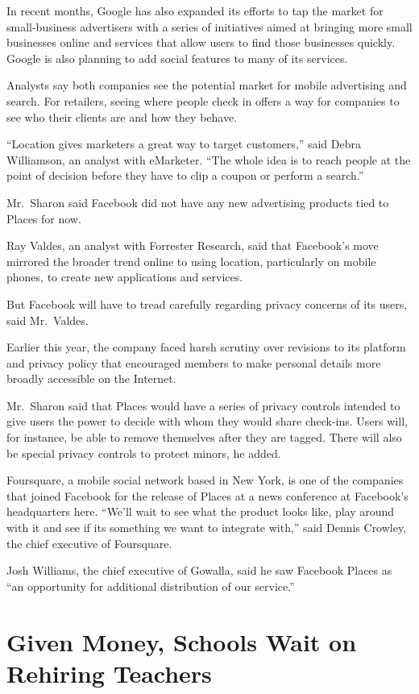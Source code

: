 ﻿\documentclass[12pt]{article}
\begin{document}
In recent months, Google has also expanded its efforts to tap the market for small-business
advertisers with a series of initiatives aimed at bringing more small businesses online and services
that allow users to find those businesses quickly. Google is also planning to add social features to
many of its services.

Analysts say both companies see the potential market for mobile advertising and search. For
retailers, seeing where people check in offers a way for companies to see who their clients are and
how they behave.

``Location gives marketers a great way to target customers,'' said Debra Williamson, an analyst with
eMarketer. ``The whole idea is to reach people at the point of decision before they have to clip a
coupon or perform a search.''

Mr.~Sharon said Facebook did not have any new advertising products tied to Places for now.

Ray Valdes, an analyst with Forrester Research, said that Facebook's move mirrored the broader trend
online to using location, particularly on mobile phones, to create new applications and services.

But Facebook will have to tread carefully regarding privacy concerns of its users, said Mr.~Valdes.

Earlier this year, the company faced harsh scrutiny over revisions to its platform and privacy
policy that encouraged members to make personal details more broadly accessible on the Internet.

Mr.~Sharon said that Places would have a series of privacy controls intended to give users the power
to decide with whom they would share check-ins. Users will, for instance, be able to remove
themselves after they are tagged. There will also be special privacy controls to protect minors, he
added.

Foursquare, a mobile social network based in New York, is one of the companies that joined Facebook
for the release of Places at a news conference at Facebook's headquarters here. ``We'll wait to see
what the product looks like, play around with it and see if its something we want to integrate
with,'' said Dennis Crowley, the chief executive of Foursquare.

Josh Williams, the chief executive of Gowalla, said he saw Facebook Places as ``an opportunity for
additional distribution of our service.''

\section{Given Money, Schools Wait on Rehiring Teachers}
\end{document}
